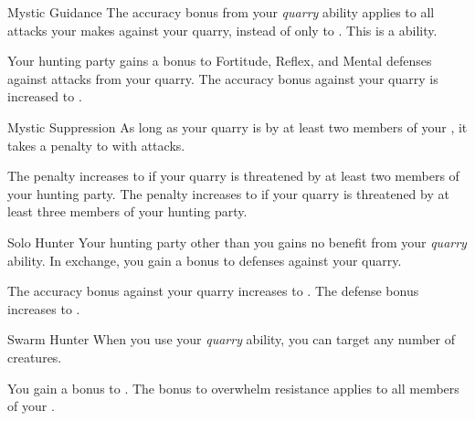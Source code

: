 {            \begin{ability}{Mystic Guidance}
                The accuracy bonus from your \textit{quarry} ability applies to all attacks your  makes against your quarry, instead of only to .
                This is a  ability.

                \rankline
                 Your hunting party gains a  bonus to Fortitude, Reflex, and Mental defenses against attacks from your quarry.
                 The accuracy bonus against your quarry is increased to .
            \end{ability}

            \begin{ability}{Mystic Suppression}
                As long as your quarry is  by at least two members of your , it takes a  penalty to  with  attacks.

                \rankline
                 The penalty increases to  if your quarry is threatened by at least two members of your hunting party.
                 The penalty increases to  if your quarry is threatened by at least three members of your hunting party.
            \end{ability}

            \begin{ability}{Solo Hunter}
                Your hunting party other than you gains no benefit from your \textit{quarry} ability.
                In exchange, you gain a  bonus to defenses against your quarry.

                \rankline
                 The accuracy bonus against your quarry increases to .
                 The defense bonus increases to .
            \end{ability}

            \begin{ability}{Swarm Hunter}
                When you use your \textit{quarry} ability, you can target any number of creatures.

                \rankline
                 You gain a  bonus to .
                 The bonus to overwhelm resistance applies to all members of your .
            \end{ability}

}
